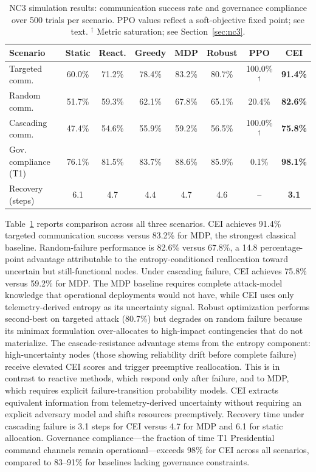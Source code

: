 \documentclass[runningheads]{llncs}
\begin{document}
\begin{table}[ht]
\caption{NC3 simulation results: communication success rate and governance compliance over 500 trials per scenario. PPO values reflect a soft-objective fixed point; see text. $^\dagger$ Metric saturation; see Section~\ref{sec:nc3}.}
\label{tab:nc3}
\centering
\footnotesize
\setlength{\tabcolsep}{4pt}
\begin{tabular}{lccccccc}
\toprule
Scenario & Static & React. & Greedy & MDP & Robust & PPO & \textbf{CEI} \\
\midrule
Targeted comm.       & 60.0\% & 71.2\% & 78.4\% & 83.2\% & 80.7\% & 100.0\%$^\dagger$ & \textbf{91.4\%} \\
Random comm.         & 51.7\% & 59.3\% & 62.1\% & 67.8\% & 65.1\% & 20.4\%             & \textbf{82.6\%} \\
Cascading comm.      & 47.4\% & 54.6\% & 55.9\% & 59.2\% & 56.5\% & 100.0\%$^\dagger$ & \textbf{75.8\%} \\
Gov. compliance (T1) & 76.1\% & 81.5\% & 83.7\% & 88.6\% & 85.9\% & 0.1\%             & \textbf{98.1\%} \\
Recovery (steps)     & 6.1    & 4.7    & 4.4    & 4.7    & 4.6    & --                 & \textbf{3.1}    \\
\bottomrule
\end{tabular}
\end{table}

Table~\ref{tab:nc3} reports comparison across all three scenarios. CEI achieves 91.4\% targeted communication success versus 83.2\% for MDP, the strongest classical baseline. Random-failure performance is 82.6\% versus 67.8\%, a 14.8 percentage-point advantage attributable to the entropy-conditioned reallocation toward uncertain but still-functional nodes. Under cascading failure, CEI achieves 75.8\% versus 59.2\% for MDP. The MDP baseline requires complete attack-model knowledge that operational deployments would not have, while CEI uses only telemetry-derived entropy as its uncertainty signal. Robust optimization performs second-best on targeted attack (80.7\%) but degrades on random failure because its minimax formulation over-allocates to high-impact contingencies that do not materialize. The cascade-resistance advantage stems from the entropy component: high-uncertainty nodes (those showing reliability drift before complete failure) receive elevated CEI scores and trigger preemptive reallocation. This is in contrast to reactive methods, which respond only after failure, and to MDP, which requires explicit failure-transition probability models. CEI extracts equivalent information from telemetry-derived uncertainty without requiring an explicit adversary model and shifts resources preemptively. Recovery time under cascading failure is 3.1 steps for CEI versus 4.7 for MDP and 6.1 for static allocation. Governance compliance---the fraction of time T1 Presidential command channels remain operational---exceeds 98\% for CEI across all scenarios, compared to 83--91\% for baselines lacking governance constraints.
\end{document}
